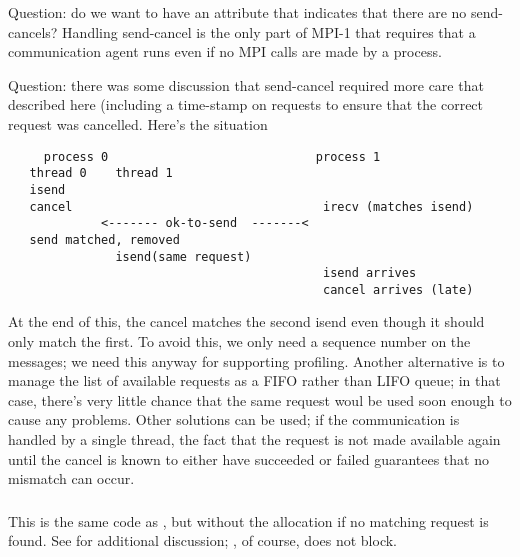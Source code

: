 \documentclass{article}
\begin{document}
Question: do we want to have an attribute that indicates that there
are no send-cancels?  Handling send-cancel is the only part of MPI-1
that requires that a communication agent runs even if no MPI calls are
made by a process.

Question: there was some discussion that send-cancel required more
care that described here (including a time-stamp on requests to ensure
that the correct request was cancelled.  Here's the situation
\begin{verbatim}
     process 0                             process 1
   thread 0    thread 1                
   isend 
   cancel                                   irecv (matches isend)
             <------- ok-to-send  -------<
   send matched, removed
               isend(same request)
                                            isend arrives
                                            cancel arrives (late)
\end{verbatim}
At the end of this, the cancel matches the second isend even though it
should only match the first.  To avoid this, we only need a sequence
number on the messages; we need this anyway for supporting profiling.
Another alternative is to manage the list of available requests as a
FIFO rather than LIFO queue; in that case, there's very little chance
that the same request woul be used soon enough to cause any problems.  
Other solutions can be used; if the communication is handled by a
single thread, the fact that the request is not made available again
until the cancel is known to either have succeeded or failed
guarantees that no mismatch can occur.

\subsubsection{}
\begin{adi3}
\begin{mmadi}
This is the same code as , but without
the allocation if no matching request is found.  See
 for additional discussion; ,
of course, does not block.
\end{mmadi}
\end{adi3}
\end{document}
